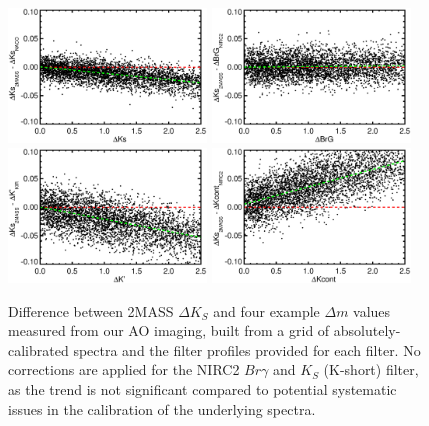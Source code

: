 \documentclass[twocolumn]{aastex62}
\begin{document}
\begin{figure}[htp]
\begin{center}
\includegraphics[width=0.47\textwidth]{NACO_Ks.eps}
\includegraphics[width=0.47\textwidth]{NIRC2_BrG.eps}
\includegraphics[width=0.47\textwidth]{KIR_Kp.eps}
\includegraphics[width=0.47\textwidth]{NIRC2_Kcont.eps}
\caption{Difference between 2MASS $\Delta K_S$ and four example $\Delta m$ values measured from our AO imaging, built from a grid of absolutely-calibrated spectra and the filter profiles provided for each filter. No corrections are applied for the NIRC2 $Br\gamma$ and $K_S$ (K-short) filter, as the trend is not significant compared to potential systematic issues in the calibration of the underlying spectra. }
\label{fig:mags}
\end{center}
\end{figure}
\end{document}

